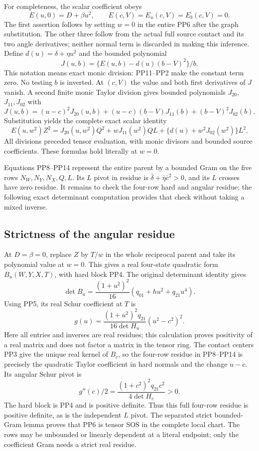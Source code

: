For completeness, the scalar coefficient obeys
\[
 E(u,0)=D+\beta u^2,\qquad
 E(c,V)=E_u(c,V)=E_b(c,V)=0.
 \tag{PP11}
\]
The first assertion follows by setting $w=0$ in the entire PP6
after the graph substitution. The other three follow from the
actual full source contact and its two angle derivatives; neither
normal term is discarded in making this inference.
Define $d(u)=\delta+\eta u^2$ and the bounded polynomial
\[
 J(u,b)=\{E(u,b)-d(u)(b-V)^2\}/b.
 \tag{PP12}
\]
This notation means exact monic division: PP11--PP2 make the
constant term zero. No testing $b$ is inverted. At $(c,V)$
the value and both first derivatives of $J$ vanish. A second
finite monic Taylor division gives bounded polynomials $J_{20}$,
$J_{11},J_{02}$ with
\[
 J(u,b)=(u-c)^2J_{20}(u,b)
       +(u-c)(b-V)J_{11}(b)+(b-V)^2J_{02}(b).
 \tag{PP13}
\]
Substitution yields the complete exact scalar identity
\[
 E(u,w^2)Z^2=J_{20}(u,w^2)Q^2+wJ_{11}(w^2)QL
                     +\{d(u)+w^2J_{02}(w^2)\}L^2.
 \tag{PP14}
\]
All divisions preceded tensor evaluation, with monic divisors and
bounded source coefficients. These formulas hold literally at $w=0$.

Equations PP8--PP14 represent the entire parent by a bounded
Gram on the five rows $N_W,N_Y,N_X,Q,L$. Its $L$ pivot in
residue is $\bar\delta+\bar\eta\bar c^2>0$, and its $L$
crosses have zero residue. It remains to check the four-row hard
and angular residue; the following exact determinant computation
provides that check without taking a mixed inverse.

\subsection{Strictness of the angular residue}

At $D=\beta=0$, replace $Z$ by $T/w$ in the whole reciprocal
parent and take its polynomial value at $w=0$. This gives a real
four-state quadratic form $B_u(W,Y,X,T)$, with hard block PP4.
The original determinant identity gives
\[
 \det B_u=\frac{(1+u^2)^2}{16}
                  (q_{01}+hu^2+q_{21}u^4).
 \tag{PP15}
\]
Using PP5, its real Schur coefficient at $T$ is
\[
 g(u)=\frac{(1+u^2)^2q_{21}}{16\det H_u}
                       (u^2-c^2)^2.
 \tag{PP16}
\]
Here all entries and inverses are real residues; this calculation
proves positivity of a real matrix and does not factor a matrix in
the tensor ring. The contact centers PP3 give the unique real
kernel of $B_c$, so the four-row residue in PP8--PP14 is precisely
the quadratic Taylor coefficient in hard normals and the change
$u-c$. Its angular Schur pivot is
\[
 g''(c)/2=\frac{(1+c^2)^2q_{21}c^2}{4\det H_c}>0.
 \tag{PP17}
\]
The hard block is PP4 and is positive definite. Thus this full
four-row residue is positive definite, as is the independent $L$
pivot. The separated strict bounded-Gram lemma proves that PP6
is tensor SOS in the complete local chart. The rows may be
unbounded or linearly dependent at a literal endpoint; only the
coefficient Gram needs a strict real residue.

